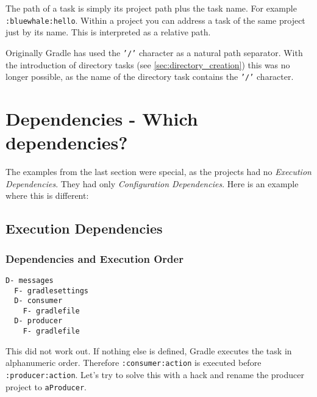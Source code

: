 The path of a task is simply its project path plus the task name. For example \texttt{:bluewhale:hello}. Within a project you can address a task of the same project just by its name. This is interpreted as a relative path.

Originally Gradle has used the \texttt{'/'} character as a natural path separator. With the introduction of directory tasks (see \ref{sec:directory_creation}) this was no longer possible, as the name of the directory task contains the \texttt{'/'} character.

\section{Dependencies - Which dependencies?} %
\label{sec:dependencies_which_dependencies}
The examples from the last section were special, as the projects had no \emph{Execution Dependencies}. They had only \emph{Configuration Dependencies}. Here is an example where this is different:

\subsection{Execution Dependencies} %
\label{sub:execution_time_dependencies}

\subsubsection{Dependencies and Execution Order} %
\label{ssub:dependencies_and_execution_order}

\begin{minipage}[t]{7cm}
\begin{Verbatim}[frame=single,label=Project Tree]
D- messages
  F- gradlesettings
  D- consumer
    F- gradlefile
  D- producer
    F- gradlefile	
\end{Verbatim}
\end{minipage}	
\begin{minipage}[t]{9cm}
\end{minipage}

This did not work out. If nothing else is defined, Gradle executes the task in alphanumeric order. Therefore \texttt{:consumer:action} is executed before \texttt{:producer:action}. Let's try to solve this with a hack and rename the producer project to \texttt{aProducer}.


